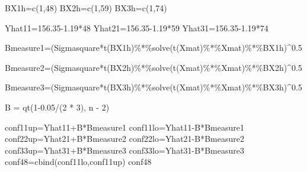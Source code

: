 \documentclass[
]{article}
\newenvironment{Shaded}{\begin{snugshade}}{\end{snugshade}}
\newcommand{\DecValTok}[1]{\textcolor[rgb]{0.00,0.00,0.81}{#1}}
\newcommand{\FloatTok}[1]{\textcolor[rgb]{0.00,0.00,0.81}{#1}}
\newcommand{\FunctionTok}[1]{\textcolor[rgb]{0.00,0.00,0.00}{#1}}
\newcommand{\NormalTok}[1]{#1}
\newcommand{\OtherTok}[1]{\textcolor[rgb]{0.56,0.35,0.01}{#1}}
\newcommand{\SpecialCharTok}[1]{\textcolor[rgb]{0.00,0.00,0.00}{#1}}
\begin{document}
\begin{Shaded}
\begin{Highlighting}[]
\NormalTok{BX1h}\OtherTok{=}\FunctionTok{c}\NormalTok{(}\DecValTok{1}\NormalTok{,}\DecValTok{48}\NormalTok{)}
\NormalTok{BX2h}\OtherTok{=}\FunctionTok{c}\NormalTok{(}\DecValTok{1}\NormalTok{,}\DecValTok{59}\NormalTok{)}
\NormalTok{BX3h}\OtherTok{=}\FunctionTok{c}\NormalTok{(}\DecValTok{1}\NormalTok{,}\DecValTok{74}\NormalTok{)}

\NormalTok{Yhat11}\OtherTok{=}\FloatTok{156.35{-}1.19}\SpecialCharTok{*}\DecValTok{48}
\NormalTok{Yhat21}\OtherTok{=}\FloatTok{156.35{-}1.19}\SpecialCharTok{*}\DecValTok{59}
\NormalTok{Yhat31}\OtherTok{=}\FloatTok{156.35{-}1.19}\SpecialCharTok{*}\DecValTok{74}


\NormalTok{Bmeasure1}\OtherTok{=}\NormalTok{(Sigmasquare}\SpecialCharTok{*}\FunctionTok{t}\NormalTok{(BX1h)}\SpecialCharTok{\%*\%}\FunctionTok{solve}\NormalTok{(}\FunctionTok{t}\NormalTok{(Xmat)}\SpecialCharTok{\%*\%}\NormalTok{Xmat)}\SpecialCharTok{\%*\%}\NormalTok{BX1h)}\SpecialCharTok{\^{}}\FloatTok{0.5}

\NormalTok{Bmeasure2}\OtherTok{=}\NormalTok{(Sigmasquare}\SpecialCharTok{*}\FunctionTok{t}\NormalTok{(BX2h)}\SpecialCharTok{\%*\%}\FunctionTok{solve}\NormalTok{(}\FunctionTok{t}\NormalTok{(Xmat)}\SpecialCharTok{\%*\%}\NormalTok{Xmat)}\SpecialCharTok{\%*\%}\NormalTok{BX2h)}\SpecialCharTok{\^{}}\FloatTok{0.5}

\NormalTok{Bmeasure3}\OtherTok{=}\NormalTok{(Sigmasquare}\SpecialCharTok{*}\FunctionTok{t}\NormalTok{(BX3h)}\SpecialCharTok{\%*\%}\FunctionTok{solve}\NormalTok{(}\FunctionTok{t}\NormalTok{(Xmat)}\SpecialCharTok{\%*\%}\NormalTok{Xmat)}\SpecialCharTok{\%*\%}\NormalTok{BX3h)}\SpecialCharTok{\^{}}\FloatTok{0.5}

\NormalTok{B }\OtherTok{=} \FunctionTok{qt}\NormalTok{(}\DecValTok{1}\FloatTok{{-}0.05}\SpecialCharTok{/}\NormalTok{(}\DecValTok{2} \SpecialCharTok{*} \DecValTok{3}\NormalTok{), n }\SpecialCharTok{{-}} \DecValTok{2}\NormalTok{)}

\NormalTok{conf11up}\OtherTok{=}\NormalTok{Yhat11}\SpecialCharTok{+}\NormalTok{B}\SpecialCharTok{*}\NormalTok{Bmeasure1}
\NormalTok{conf11lo}\OtherTok{=}\NormalTok{Yhat11}\SpecialCharTok{{-}}\NormalTok{B}\SpecialCharTok{*}\NormalTok{Bmeasure1  }
\NormalTok{conf22up}\OtherTok{=}\NormalTok{Yhat21}\SpecialCharTok{+}\NormalTok{B}\SpecialCharTok{*}\NormalTok{Bmeasure2 }
\NormalTok{conf22lo}\OtherTok{=}\NormalTok{Yhat21}\SpecialCharTok{{-}}\NormalTok{B}\SpecialCharTok{*}\NormalTok{Bmeasure2  }
\NormalTok{conf33up}\OtherTok{=}\NormalTok{Yhat31}\SpecialCharTok{+}\NormalTok{B}\SpecialCharTok{*}\NormalTok{Bmeasure3  }
\NormalTok{conf33lo}\OtherTok{=}\NormalTok{Yhat31}\SpecialCharTok{{-}}\NormalTok{B}\SpecialCharTok{*}\NormalTok{Bmeasure3}
\NormalTok{conf48}\OtherTok{=}\FunctionTok{cbind}\NormalTok{(conf11lo,conf11up)}
\NormalTok{conf48}
\end{Highlighting}
\end{Shaded}
\end{document}

